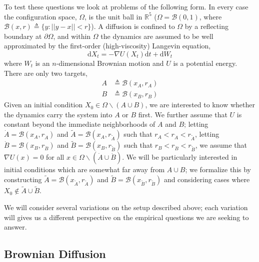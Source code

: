 \documentclass[12pt, nofootinbib,english, amsmath, amssymb, aps, priprint, graphicx,floatfix]{revtex4-1}
\newcommand{\nin}{\not\in}
\theoremstyle{plain}
\theoremstyle{definition}
\theoremstyle{plain}
\newcommand{\bb}[1]{\mathcal{B}\left(#1\right)}
\newcommand{\dA}{{\dot A}}
\newcommand{\tA}{{\tilde A}}
\newcommand{\dB}{{\dot B}}
\newcommand{\tB}{{\tilde B}}
\begin{document}
To test these questions we look at problems of the following form.  In every case the configuration space,
$\Omega$, is the unit ball in $\mathbb{R}^5$
($\Omega = \bb{0,1}$, where $\bb{x, r} \triangleq \{ y : || y - x || < r \}$). A diffusion is confined to $\Omega$ by a reflecting boundary at $\partial\Omega$, and within $\Omega$ the dynamics are assumed to be well approximated by the first-order (high-viscosity) Langevin equation,
\begin{equation}
\label{equ:toy_sde}
\mathrm{d} X_t = - \nabla U (X_t) \mathrm{d} t + \mathrm{d} W_t
\end{equation}
where $W_t$ is an $n$-dimensional Brownian motion and
$U$ is a potential energy. There are only two targets,
\begin{align*}
A &\triangleq \bb {x_A, r_A}\\
B &\triangleq \bb {x_B, r_B}
\end{align*}
Given an initial condition $X_0\in \Omega \backslash (A\cup B)$, we are interested to know whether the dynamics carry the system into $A$ or $B$ first.  We further assume that $U$ is constant beyond the immediate neighborhoods of $A$ and $B$; letting $\dA=\bb{x_A,r_\dA }$ and $\tA=\bb{x_A,r_\tA }$ such that $r_A<r_\dA<r_\tA$, letting $\dB=\bb{x_B,r_\dB }$ and  $\tB=\bb{x_B,r_\tB}$ such that $r_B<r_\dB<r_\tB$, we assume that $\nabla U(x)=0$ for all $x\in\Omega\backslash (\dA\cup\dB)$.  We will be particularly interested in initial conditions which are somewhat far away from $A\cup B$; we formalize this by constructing $\tA=\bb{x_\tA, r_\tA}$ and $\tB=\bb{x_\tB, r_\tB}$ and considering cases where $X_0 \nin \tA \cup \tB$.

We will consider several variations on the setup described above; each variation will gives us a different perspective on the empirical questions we are seeking to answer.  
\subsection{Brownian Diffusion}
\label{sec:B_D}
\end{document}
